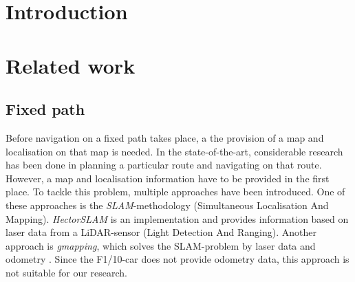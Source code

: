 \documentclass[conference,a4paper]{IEEEtran}
\begin{document}
\begin{abstract}
\lipsum[1]

\end{abstract}


%
\IEEEpeerreviewmaketitle



\section{Introduction}

\section{Related work}
\subsection{Fixed path}
Before navigation on a fixed path takes place, a the provision of a map and localisation on that map is needed. 
In the state-of-the-art, considerable research has been done in planning a particular route and navigating on that route. However, a map and localisation information have to be provided in the first place. To tackle this problem, multiple approaches have been introduced. One of these approaches is the \emph{SLAM}-methodology (Simultaneous Localisation And Mapping). \emph{Hector\textunderscore SLAM} is an implementation and provides information based on laser data from a LiDAR-sensor (Light Detection And Ranging)\cite{Kohlbrecher2011, Kohlbrecher2012}. Another approach is \emph{gmapping}, which solves the SLAM-problem by laser data and odometry \cite{Grisetti2007}. Since the F1/10-car does not provide odometry data, this approach is not suitable for our research.
\end{document}
